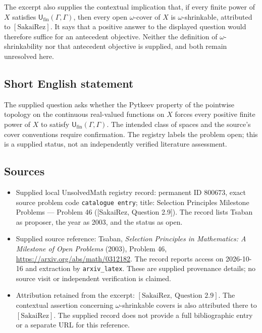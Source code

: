 \documentclass[11pt]{article}
\begin{document}
The excerpt also supplies the contextual implication that, if every finite power of \(X\) satisfies \(\mathsf U_{\mathrm{fin}}(\Gamma,\Gamma)\), then every open \(\omega\)-cover of \(X\) is \(\omega\)-shrinkable, attributed to \([\mathrm{SakaiRez}]\). It says that a positive answer to the displayed question would therefore suffice for an antecedent objective. Neither the definition of \(\omega\)-shrinkability nor that antecedent objective is supplied, and both remain unresolved here.
\subsection{Short English statement}
The supplied question asks whether the Pytkeev property of the pointwise topology on the continuous real-valued functions on \(X\) forces every positive finite power of \(X\) to satisfy \(\mathsf U_{\mathrm{fin}}(\Gamma,\Gamma)\). The intended class of spaces and the source's cover conventions require confirmation. The registry labels the problem open; this is a supplied status, not an independently verified literature assessment.
\subsection{Sources}
\begin{itemize}
\item Supplied local UnsolvedMath registry record: permanent ID \(800673\), exact source problem code \texttt{catalogue entry}; title: Selection Principles Milestone Problems --- Problem 46 ([SakaiRez, Question 2.9]). The record lists Tsaban as proposer, the year as 2003, and the status as open.
\item Supplied source reference: Tsaban, \emph{Selection Principles in Mathematics: A Milestone of Open Problems} (2003), Problem 46, \url{https://arxiv.org/abs/math/0312182}. The record reports access on 2026-10-16 and extraction by \texttt{arxiv\_latex}. These are supplied provenance details; no source visit or independent verification is claimed.
\item Attribution retained from the excerpt: \([\mathrm{SakaiRez},\ \text{Question }2.9]\). The contextual assertion concerning \(\omega\)-shrinkable covers is also attributed there to \([\mathrm{SakaiRez}]\). The supplied record does not provide a full bibliographic entry or a separate URL for this reference.
\end{itemize}
\end{document}
